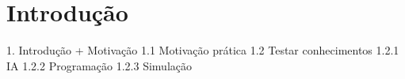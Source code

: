 \chapter{\label{chap:intro}Introdução}

1. Introdução + Motivação
1.1 Motivação prática
1.2 Testar conhecimentos
1.2.1 IA
1.2.2 Programação
1.2.3 Simulação